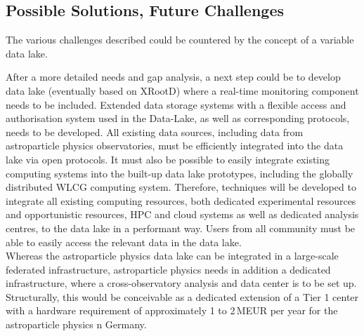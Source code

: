 \subsection{Possible Solutions, Future Challenges}

The various challenges described could be countered by the concept of a variable data lake. 

After a more detailed needs and gap analysis, a next step could be to 
develop data lake (eventually based on XRootD) where a real-time monitoring component needs to be included. 
Extended data storage systems with a flexible access and authorisation system used in the Data-Lake, as well as corresponding protocols, needs to be developed. 
All existing data sources, including data from astroparticle physics observatories, must be efficiently integrated into the data lake via open protocols. It must also be possible to easily integrate existing computing systems into the built-up data lake prototypes, including the globally distributed WLCG computing system. 
Therefore, techniques will be developed to integrate all existing computing resources, both dedicated experimental resources and opportunistic resources, HPC and cloud systems as well as dedicated analysis centres, to the data lake in a performant way. 
Users from all community must be able to easily access the relevant data in the data lake. \\

Whereas the astroparticle physics data lake can be integrated in a large-scale federated infrastructure, astroparticle physics needs in addition a dedicated infrastructure, where a cross-observatory analysis and data center is to be set up. 
Structurally, this would be conceivable as a dedicated extension of a Tier 1
center with a hardware requirement of approximately 1 to 2\,MEUR per year for the astroparticle physics n Germany.












